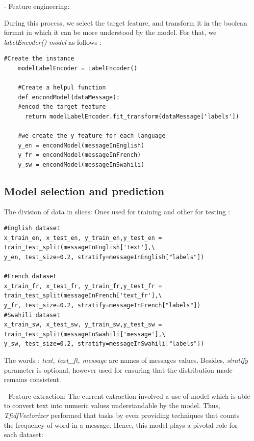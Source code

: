 \documentclass[12pt,a4paper, oneside]{book}
\begin{document}
- Feature engineering:

  During this process, we select the target feature, and transform it in the boolean format in which it can be more understood by the model. For that, we \textit{labelEncoder() model} as follows :
  \begin{lstlisting}[style=stylejupyter]
  	#Create the instance
  	modelLabelEncoder = LabelEncoder() 
  	
  	#Create a helpul function
  	def encondModel(dataMessage):
  	#encod the target feature
  	  return modelLabelEncoder.fit_transform(dataMessage['labels'])  
  	
  	#we create the y feature for each language
  	y_en = encondModel(messageInEnglish) 
  	y_fr = encondModel(messageInFrench) 
  	y_sw = encondModel(messageInSwahili)
  \end{lstlisting}

\subsection{Model selection and prediction}
The division of data in slices: Ones used for training and other for testing :
\begin{lstlisting}[style=stylejupyter]
#English dataset
x_train_en, x_test_en, y_train_en,y_test_en = train_test_split(messageInEnglish['text'],\
y_en, test_size=0.2, stratify=messageInEnglish["labels"])

#French dataset
x_train_fr, x_test_fr, y_train_fr,y_test_fr = train_test_split(messageInFrench['text_fr'],\
y_fr, test_size=0.2, stratify=messageInFrench["labels"])
#Swahili dataset
x_train_sw, x_test_sw, y_train_sw,y_test_sw = train_test_split(messageInSwahili['message'],\
y_sw, test_size=0.2, stratify=messageInSwahili["labels"])
\end{lstlisting}

The words : \textit{text, text\_ft, message} are names of messages values. Besides, \textit{stratify} parameter is optional, however used for ensuring that the distribution made remains consistent.
 
- Feature extraction:
 The current extraction involved a use of model which is able to convert text into numeric values understandable by the model. Thus, \textit{TfidfVectorizer} performed that tasks by even providing techniques that counts the frequency of word in a message. Hence, this model plays a pivotal role for each dataset:
\end{document}
